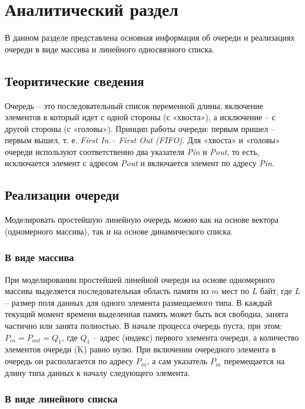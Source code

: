 \chapter{Аналитический раздел}

В данном разделе представлена основная информация об очереди и реализациях очереди в виде массива и линейного односвязного списка.

\section{Теоритические сведения}

Очередь  – это  последовательный  список  переменной  длины,  включение 
элементов в который идет с одной стороны (с «хвоста»), а исключение –  с другой 
стороны (с «головы»). Принцип работы очереди: первым пришел – первым вышел, т. 
е. \textit{First In – First Out (FIFO)}. 
Для «хвоста» и «головы» очереди используют соответственно два указателя \textit{Pin} 
и \textit{Pout}, то есть, исключается элемент с адресом \textit{Pout} и включается элемент по адресу 
\textit{Pin}.

\section{Реализации очереди}

Моделировать  простейшую  линейную  очередь  можно  как  на  основе  вектора 
(одномерного массива), так и на основе динамического списка.

\subsection{В виде массива}

При  моделировании  простейшей 
линейной  очереди  на  основе  одномерного  массива  выделяется  последовательная 
область памяти из $m$ мест по $L$ байт, где $L$ – размер поля данных для одного элемента 
размещаемого типа. В каждый текущий момент времени выделенная память может 
быть вся свободна, занята частично или занята полностью. 
В  начале  процесса  очередь  пуста,  при  этом:  $P_{in}  =  P_{out}  = Q_1$,  где  $Q_1$  –  адрес 
(индекс) первого элемента очереди, а количество элементов очереди (K) равно нулю. 
При включении очередного элемента в очередь он располагается по адресу $P_{in}$, а сам 
указатель $P_{in}$  перемещается на длину типа данных к началу следующего элемента.

\subsection{В виде линейного списка}


